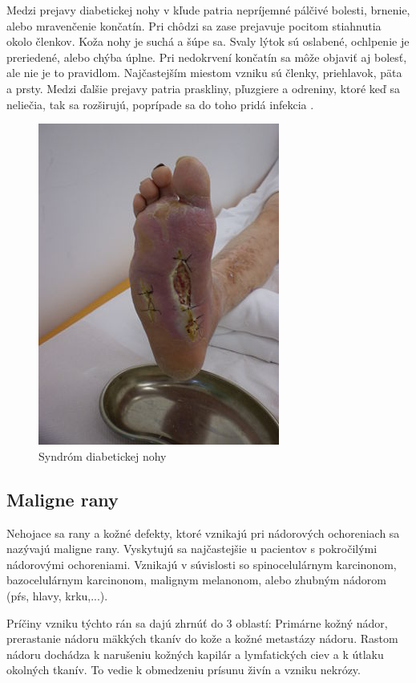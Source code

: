Medzi prejavy diabetickej nohy v kľude patria nepríjemné pálčivé bolesti, brnenie, alebo mravenčenie končatín. Pri chôdzi sa zase prejavuje pocitom stiahnutia okolo členkov. Koža nohy je suchá a šúpe sa. Svaly lýtok sú oslabené, ochlpenie je preriedené, alebo chýba úplne. Pri nedokrvení končatín sa môže objaviť aj bolesť, ale nie je to pravidlom. Najčastejším miestom vzniku sú členky, priehlavok, päta a prsty. Medzi ďalšie prejavy patria praskliny, pľuzgiere a odreniny, ktoré keď sa neliečia, tak sa rozširujú, poprípade sa do toho pridá infekcia \cite{pcCdSrbbhhlr5YcQ, Pokorna2012}.
\begin{figure}[h]
  \centering
  \includegraphics[scale=2]{fig/diabeticka-noha.jpg}
  \caption{Syndróm diabetickej nohy \cite{uGOum7N9LzIGa5X2}}
  \label{fig:diabeticka-noha}
\end{figure}

\subsection{Maligne rany}
Nehojace sa rany a kožné defekty, ktoré vznikajú pri nádorových ochoreniach sa nazývajú maligne rany. Vyskytujú sa najčastejšie u pacientov s pokročilými nádorovými ochoreniami. Vznikajú v súvislosti so spinocelulárnym karcinonom, bazocelulárnym karcinonom, malignym melanonom, alebo zhubným nádorom (pŕs, hlavy, krku,...).

Príčiny vzniku týchto rán sa dajú zhrnúť do 3 oblastí: Primárne kožný nádor, prerastanie nádoru mäkkých tkanív do kože a kožné metastázy nádoru. Rastom nádoru dochádza k narušeniu kožných kapilár a lymfatických ciev a k útlaku okolných tkanív. To vedie k obmedzeniu prísunu živín a vzniku nekrózy.

